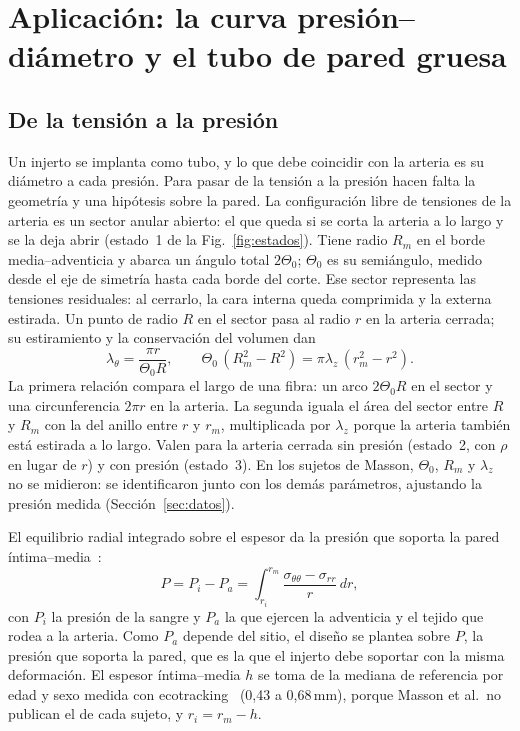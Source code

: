 \section{Aplicación: la curva presión--diámetro y el tubo de pared gruesa}\label{sec:aplicacion}
\subsection{De la tensión a la presión}
Un injerto se implanta como tubo, y lo que debe coincidir con la arteria es su diámetro a cada presión. Para pasar de la tensión a la presión hacen falta la geometría y una hipótesis sobre la pared. La configuración libre de tensiones de la arteria es un sector anular abierto: el que queda si se corta la arteria a lo largo y se la deja abrir (estado~1 de la Fig.~\ref{fig:estados}). Tiene radio $R_m$ en el borde media--adventicia y abarca un ángulo total $2\Theta_0$; $\Theta_0$ es su semiángulo, medido desde el eje de simetría hasta cada borde del corte. Ese sector representa las tensiones residuales: al cerrarlo, la cara interna queda comprimida y la externa estirada. Un punto de radio $R$ en el sector pasa al radio $r$ en la arteria cerrada; su estiramiento y la conservación del volumen dan~\cite{masson}
\begin{equation}\label{eq:cinem}
\lambda_\theta=\frac{\pi r}{\Theta_0R},\qquad \Theta_0\,(R_m^2-R^2)=\pi\lambda_z\,(r_m^2-r^2).
\end{equation}
La primera relación compara el largo de una fibra: un arco $2\Theta_0R$ en el sector y una circunferencia $2\pi r$ en la arteria. La segunda iguala el área del sector entre $R$ y $R_m$ con la del anillo entre $r$ y $r_m$, multiplicada por $\lambda_z$ porque la arteria también está estirada a lo largo. Valen para la arteria cerrada sin presión (estado~2, con $\rho$ en lugar de $r$) y con presión (estado~3). En los sujetos de Masson, $\Theta_0$, $R_m$ y $\lambda_z$ no se midieron: se identificaron junto con los demás parámetros, ajustando la presión medida (Sección~\ref{sec:datos}).

El equilibrio radial integrado sobre el espesor da la presión que soporta la pared íntima--media~\cite{masson,humphrey}:
\begin{equation}\label{eq:equil}
P=P_i-P_a=\int_{r_i}^{r_m}\frac{\sigma_{\theta\theta}-\sigma_{rr}}{r}\,dr,
\end{equation}
con $P_i$ la presión de la sangre y $P_a$ la que ejercen la adventicia y el tejido que rodea a la arteria. Como $P_a$ depende del sitio, el diseño se plantea sobre $P$, la presión que soporta la pared, que es la que el injerto debe soportar con la misma deformación. El espesor íntima--media $h$ se toma de la mediana de referencia por edad y sexo medida con ecotracking~\cite{engelen13} (0,43 a 0,68\,mm), porque Masson et al.\ no publican el de cada sujeto, y $r_i=r_m-h$.

